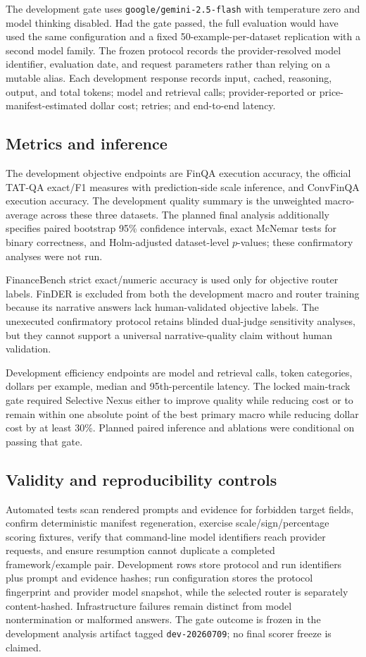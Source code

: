 The development gate uses \nolinkurl{google/gemini-2.5-flash} with temperature zero and model thinking disabled. Had the gate passed, the full evaluation would have used the same configuration and a fixed 50-example-per-dataset replication with a second model family. The frozen protocol records the provider-resolved model identifier, evaluation date, and request parameters rather than relying on a mutable alias. Each development response records input, cached, reasoning, output, and total tokens; model and retrieval calls; provider-reported or price-manifest-estimated dollar cost; retries; and end-to-end latency.

\subsection{Metrics and inference}

The development objective endpoints are FinQA execution accuracy, the official TAT-QA exact/F1 measures with prediction-side scale inference, and ConvFinQA execution accuracy. The development quality summary is the unweighted macro-average across these three datasets. The planned final analysis additionally specifies paired bootstrap 95\% confidence intervals, exact McNemar tests for binary correctness, and Holm-adjusted dataset-level $p$-values; these confirmatory analyses were not run.

FinanceBench strict exact/numeric accuracy is used only for objective router labels. FinDER is excluded from both the development macro and router training because its narrative answers lack human-validated objective labels. The unexecuted confirmatory protocol retains blinded dual-judge sensitivity analyses, but they cannot support a universal narrative-quality claim without human validation.

Development efficiency endpoints are model and retrieval calls, token categories, dollars per example, median and 95th-percentile latency. The locked main-track gate required Selective Nexus either to improve quality while reducing cost or to remain within one absolute point of the best primary macro while reducing dollar cost by at least 30\%. Planned paired inference and ablations were conditional on passing that gate.

\subsection{Validity and reproducibility controls}

Automated tests scan rendered prompts and evidence for forbidden target fields, confirm deterministic manifest regeneration, exercise scale/sign/percentage scoring fixtures, verify that command-line model identifiers reach provider requests, and ensure resumption cannot duplicate a completed framework/example pair. Development rows store protocol and run identifiers plus prompt and evidence hashes; run configuration stores the protocol fingerprint and provider model snapshot, while the selected router is separately content-hashed. Infrastructure failures remain distinct from model nontermination or malformed answers. The gate outcome is frozen in the development analysis artifact tagged \texttt{dev-20260709}; no final scorer freeze is claimed.
